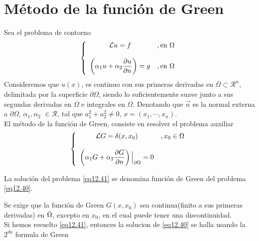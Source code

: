 \documentclass[../main]{subfiles}
\begin{document}
\section{Método de la función de Green}
Sea el problema de contorno
\begin{equation}
    \begin{split}
    \left\{
        \begin{array}{cc}
         \mathcal{L}u=f    & ,\text{en} \ \Omega \\ \\
         \displaystyle \left( \alpha_1 u+\alpha_2 \pdv{u}{n}\right)=g    &  ,\text{en} \ \Omega
        \end{array} 
    \right.
    \end{split}
    \label{eq12.40}
\end{equation}
Consideremos que $u(x)$, es continuo con sus primeras derivadas en $\bar{\Omega} \subset \mathcal{R}^n$, delimitada por la superficie $\partial \Omega$, siendo lo suficientemente suave junto a sus segundas derivadas en $\Omega$ e integrales en $\Omega$. Denotando que $\Vec{n}$ es la normal externa a $\partial \Omega$, $\alpha_1, \alpha_2$ $\in \mathcal{R}$, tal que $a_1^2+a_2^2\neq 0$, $x=(x_1, \cdots , x_n)$. \\[0.3cm]
El método de la función de Green, consiste en resolver el problema auxiliar
\begin{equation}
    \begin{split}
    \left\{
        \begin{array}{cc}
         \mathcal{L}G=\delta(x,x_0)    & ,x_0 \in \Omega \\ \\
         \displaystyle \left( \alpha_1 G+\alpha_2 \pdv{G}{n}\right)\Big{|}_{\partial \Omega}=0    &   \ 
        \end{array} 
    \right.
    \end{split}
    \label{eq12.41}
\end{equation}
\begin{definicion}
    La solución del problema \eqref{eq12.41} se denomina función de Green del problema \eqref{eq12.40}. 
\end{definicion}
    Se exige que la función de Green $G(x,x_0)$ sea continua(finito a sus primeras derivadas) en $\Bar{\Omega}$, excepto en $x_0$, en el cual puede tener una discontinuidad. \\[0.3cm]
    Si hemos resuelto \eqref{eq12.41}, entonces la solucion de \eqref{eq12.40} se halla usando la $2^{da}$ formula de Green
\end{document}
